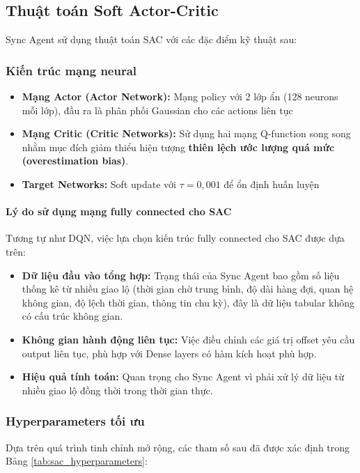 \subsection{Thuật toán Soft Actor-Critic}
Sync Agent sử dụng thuật toán SAC với các đặc điểm kỹ thuật sau:

\subsubsection{Kiến trúc mạng neural}
\begin{itemize}
    \item \textbf{Mạng Actor (Actor Network):} Mạng policy với 2 lớp ẩn (128 neurons mỗi lớp),
        đầu ra là phân phối Gaussian cho các actions liên tục

    \item \textbf{Mạng Critic (Critic Networks):} Sử dụng hai mạng Q-function song song nhằm mục đích giảm thiểu hiện tượng \textbf{thiên lệch ước lượng quá mức (overestimation bias)}.

    \item \textbf{Target Networks:} Soft update với $\tau = 0,001$ để ổn định
        huấn luyện
\end{itemize}

\paragraph{Lý do sử dụng mạng fully connected cho SAC}
Tương tự như DQN, việc lựa chọn kiến trúc fully connected cho SAC được dựa trên:
\begin{itemize}
    \item \textbf{Dữ liệu đầu vào tổng hợp:} Trạng thái của Sync Agent bao gồm số liệu thống kê từ nhiều giao lộ (thời gian chờ trung bình, độ dài hàng đợi, quan hệ không gian, độ lệch thời gian, thông tin chu kỳ), đây là dữ liệu tabular không có cấu trúc không gian.
    \item \textbf{Không gian hành động liên tục:} Việc điều chỉnh các giá trị offset yêu cầu output liên tục, phù hợp với Dense layers có hàm kích hoạt phù hợp.
        \item \textbf{Hiệu quả tính toán:} Quan trọng cho Sync Agent vì phải xử lý dữ liệu từ nhiều giao lộ đồng thời trong thời gian thực.
    \end{itemize}

\subsubsection{Hyperparameters tối ưu}
Dựa trên quá trình tinh chỉnh mở rộng, các tham số sau đã được xác định trong Bảng \ref{tab:sac_hyperparameters}:

